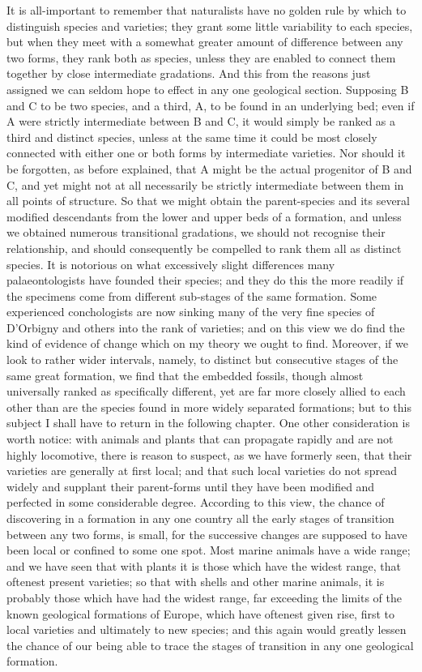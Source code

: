 It is all-important to remember that naturalists have no golden rule by which to distinguish species and varieties; they grant some little variability to each species, but when they meet with a somewhat greater amount of difference between any two forms, they rank both as species, unless they are enabled to connect them together by close intermediate gradations. And this from the reasons just assigned we can seldom hope to effect in any one geological section. Supposing B and C to be two species, and a third, A, to be found in an underlying bed; even if A were strictly intermediate between B and C, it would simply be ranked as a third and distinct species, unless at the same time it could be most closely connected with either one or both forms by intermediate varieties. Nor should it be forgotten, as before explained, that A might be the actual progenitor of B and C, and yet might not at all necessarily be strictly intermediate between them in all points of structure. So that we might obtain the parent-species and its several modified descendants from the lower and upper beds of a formation, and unless we obtained numerous transitional gradations, we should not recognise their relationship, and should consequently be compelled to rank them all as distinct species.
It is notorious on what excessively slight differences many palaeontologists have founded their species; and they do this the more readily if the specimens come from different sub-stages of the same formation. Some experienced conchologists are now sinking many of the very fine species of D'Orbigny and others into the rank of varieties; and on this view we do find the kind of evidence of change which on my theory we ought to find. Moreover, if we look to rather wider intervals, namely, to distinct but consecutive stages of the same great formation, we find that the embedded fossils, though almost universally ranked as specifically different, yet are far more closely allied to each other than are the species found in more widely separated formations; but to this subject I shall have to return in the following chapter.
One other consideration is worth notice: with animals and plants that can propagate rapidly and are not highly locomotive, there is reason to suspect, as we have formerly seen, that their varieties are generally at first local; and that such local varieties do not spread widely and supplant their parent-forms until they have been modified and perfected in some considerable degree. According to this view, the chance of discovering in a formation in any one country all the early stages of transition between any two forms, is small, for the successive changes are supposed to have been local or confined to some one spot. Most marine animals have a wide range; and we have seen that with plants it is those which have the widest range, that oftenest present varieties; so that with shells and other marine animals, it is probably those which have had the widest range, far exceeding the limits of the known geological formations of Europe, which have oftenest given rise, first to local varieties and ultimately to new species; and this again would greatly lessen the chance of our being able to trace the stages of transition in any one geological formation.
